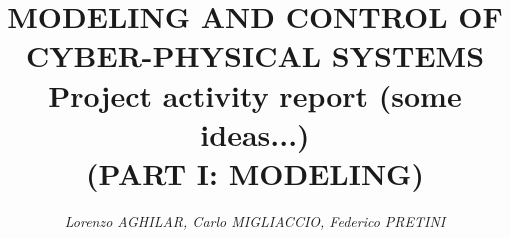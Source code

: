 \documentclass[a4paper, 12pt]{article}
\begin{document}
    
    \title{
        \vspace{-2cm}
        \textbf{
        {\large{MODELING AND CONTROL OF CYBER-PHYSICAL SYSTEMS}}\\
        {\huge{Project activity report (some ideas...)}}\\
        \normalsize{(PART I: MODELING)}
        }
    }
    
    \author{
        \textit{    
        Lorenzo AGHILAR,
        Carlo MIGLIACCIO, 
        Federico PRETINI }
    }
    
    \clearpage\maketitle
    \thispagestyle{empty}





\end{document}
